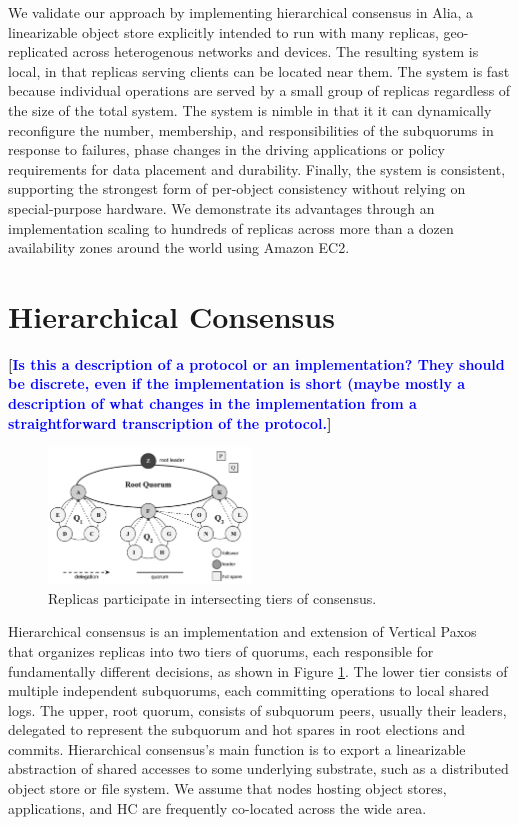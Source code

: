 \documentclass[11pt,conference]{IEEEtran}
\newcommand{\hc}{hierarchical consensus\xspace}
\renewcommand{\pjk}[1]{{\bf
    [\marginpar[\hbox{{\textcolor{blue}{pjk}}\raisebox{0ex}{\Huge $\rightarrow$}}]%
{\hbox{\raisebox{0ex}{\Huge $\leftarrow$}{\textcolor{blue}{pjk}}}}\textcolor{blue}{#1}]}}
\begin{document}
We validate our approach by implementing \hc in Alia, a linearizable object store
explicitly intended to run with many replicas, geo-replicated across heterogenous
networks and devices.
The resulting system is local, in that replicas serving clients can be located near them.
The system is fast because individual operations are served by a small group of replicas
regardless of the size of the total system.
The system is nimble in that it it can dynamically reconfigure the number, membership,
and responsibilities of the subquorums in response to failures, phase changes in the
driving applications or policy requirements for data placement and durability.
Finally, the system is consistent, supporting the strongest form of per-object
consistency without relying on special-purpose hardware.
We demonstrate its advantages through an implementation scaling to hundreds of replicas
across more than a dozen availability zones around the world using Amazon EC2.



\section{Hierarchical Consensus}
\pjk{Is this a description of a  protocol or an implementation?  They should be
  discrete, even if the implementation is short (maybe mostly a description
  of what changes in the implementation from a straightforward
  transcription of the protocol.}
\begin{figure}[t]
    \centering
    \includegraphics[width=0.48\textwidth]{figures/election3}
    \caption{Replicas participate in intersecting tiers of consensus.}
    \label{fig:system}
\end{figure}

Hierarchical consensus is an implementation and extension of Vertical
Paxos~\cite{vertical_paxos} that organizes replicas into two tiers of
quorums, each responsible for fundamentally different decisions, as shown
in Figure \ref{fig:system}.
The lower tier consists of multiple independent subquorums, each committing
operations to local shared logs.
The upper, root quorum, consists of subquorum peers, usually their leaders,
delegated to represent the subquorum and hot spares in root elections and
commits.
Hierarchical consensus's main function is to export a linearizable abstraction
of shared accesses to some underlying substrate, such as a distributed
object store or file system.
We assume that nodes hosting object stores, applications, and HC are
frequently co-located across the wide area.
\end{document}
